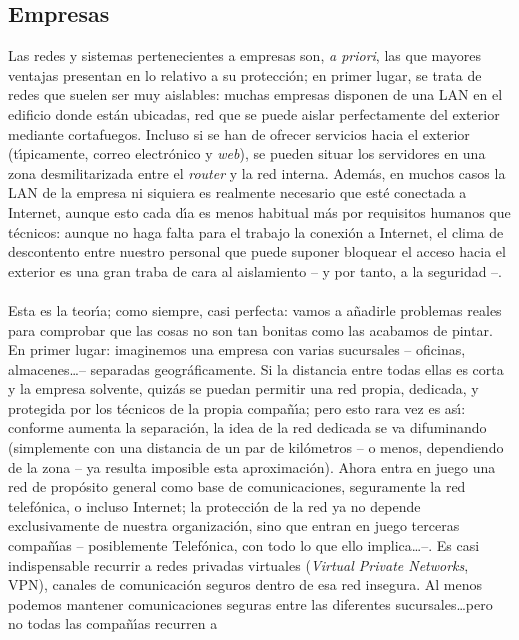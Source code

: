 \subsection{Empresas}
Las redes y sistemas pertenecientes a empresas son, {\it a priori}, las que 
mayores ventajas presentan en lo relativo a su protecci\'on; en primer lugar,
se trata de redes que suelen ser muy aislables: muchas empresas disponen de una
LAN en el edificio donde est\'an ubicadas, red que se puede aislar perfectamente
del exterior mediante cortafuegos. Incluso si se han de ofrecer servicios hacia
el exterior (t\'{\i}picamente, correo electr\'onico y {\it web}), se pueden 
situar los servidores en una zona desmilitarizada entre el {\it router} y la
red interna. Adem\'as, en muchos casos la LAN de la empresa ni siquiera es 
realmente necesario que est\'e conectada a Internet, aunque esto cada d\'{\i}a
es menos habitual m\'as por requisitos humanos que t\'ecnicos: aunque no haga
falta para el trabajo la conexi\'on a Internet, el clima de descontento entre
nuestro personal que puede suponer bloquear el acceso hacia el exterior es una
gran traba de cara al aislamiento -- y por tanto, a la seguridad --.\\
\\Esta es la teor\'{\i}a; como siempre, casi perfecta: vamos a a\~nadirle 
problemas reales para comprobar que las cosas no son tan bonitas como las 
acabamos de pintar. En primer lugar: imaginemos una empresa con varias 
sucursales -- oficinas, almacenes\ldots -- separadas geogr\'aficamente. Si la
distancia entre todas ellas es corta y la empresa solvente, quiz\'as se puedan
permitir una red propia, dedicada, y protegida por los t\'ecnicos de la propia
compa\~n\'{\i}a; pero esto rara vez es as\'{\i}: conforme aumenta la 
separaci\'on, la idea de la red dedicada se va difuminando (simplemente con una
distancia de un par de kil\'ometros -- o menos, dependiendo de la zona -- ya
resulta imposible esta aproximaci\'on). Ahora entra en juego una red de 
prop\'osito general como base de comunicaciones, seguramente la red 
telef\'onica, o incluso Internet; la protecci\'on de la red ya no depende 
exclusivamente de nuestra organizaci\'on, sino que entran en juego terceras
compa\~n\'{\i}as -- posiblemente Telef\'onica, con todo lo que ello 
implica\ldots --. Es casi indispensable recurrir a redes privadas virtuales
({\it Virtual Private Networks}, VPN), canales de comunicaci\'on seguros dentro
de esa red insegura. Al menos podemos mantener comunicaciones seguras entre las 
diferentes sucursales\ldots pero no todas las compa\~n\'{\i}as recurren a 
